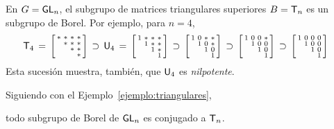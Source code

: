 \begin{ejemploTriangulares}\label{ejemplo:triangulares}
	En $G=\GL[n]$, el subgrupo de matrices triangulares superiores
	$B=\triangulares[n]$ es un subgrupo de Borel. Por ejemplo, para $n=4$,
	\begin{align*}
		\triangulares[4] \,=\,
			\left[\begin{smallmatrix}
				* & * & * & * \\
				& * & * & * \\
				& & * & * \\
				& & & *
			\end{smallmatrix}\right] & \,\supset\,
			\mathsf{U}_4\,=\,\left[\begin{smallmatrix}
				1 & * & * & * \\
				& 1 & * & * \\
				& & 1 & * \\
				& & & 1
			\end{smallmatrix}\right] \,\supset\,
			\left[\begin{smallmatrix}
				1 & 0 & * & * \\
				& 1 & 0 & * \\
				& & 1 & 0 \\
				& & & 1
			\end{smallmatrix}\right] \,\supset\,
			\left[\begin{smallmatrix}
				1 & 0 & 0 & * \\
				& 1 & 0 & 0 \\
				& & 1 & 0 \\
				& & & 1
			\end{smallmatrix}\right] \,\supset\,
			\left[\begin{smallmatrix}
				1 & 0 & 0 & 0 \\
				& 1 & 0 & 0 \\
				& & 1 & 0 \\
				& & & 1
			\end{smallmatrix}\right]
	\end{align*}
	Esta sucesi\'{o}n muestra, tambi\'{e}n, que $\unipotentes[4]$ es
	\emph{nilpotente}.
\end{ejemploTriangulares}

Siguiendo con el Ejemplo~\ref{ejemplo:triangulares},

\begin{propoTriangulares}\label{propo:triangulares}
	todo subgrupo de Borel de $\GL[n]$ es conjugado a $\triangulares[n]$.
\end{propoTriangulares}

